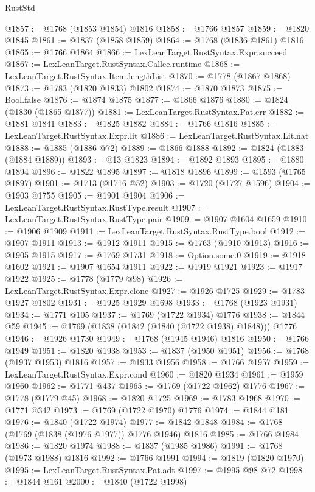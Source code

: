 \begin{lexlean}{RustStd}
\begin{coremodule}
@1857 := @1768 (@1853 @1854) @1816
@1858 := @1766 @1857
@1859 := @1820 @1845
@1861 := @1837 (@1858 @1859)
@1864 := @1768 (@1836 @1861) @1816
@1865 := @1766 @1864
@1866 := LexLeanTarget.RustSyntax.Expr.succeed
@1867 := LexLeanTarget.RustSyntax.Callee.runtime
@1868 := LexLeanTarget.RustSyntax.Item.lengthList
@1870 := @1778 (@1867 @1868)
@1873 := @1783 (@1820 @1833) @1802
@1874 := @1870 @1873
@1875 := Bool.false
@1876 := @1874 @1875
@1877 := @1866 @1876
@1880 := @1824 (@1830 (@1865 @1877))
@1881 := LexLeanTarget.RustSyntax.Pat.err
@1882 := @1881 @1841
@1883 := @1825 @1882
@1884 := @1766 @1816
@1885 := LexLeanTarget.RustSyntax.Expr.lit
@1886 := LexLeanTarget.RustSyntax.Lit.nat
@1888 := @1885 (@1886 @72)
@1889 := @1866 @1888
@1892 := @1824 (@1883 (@1884 @1889))
@1893 := @13 @1823
@1894 := @1892 @1893
@1895 := @1880 @1894
@1896 := @1822 @1895
@1897 := @1818 @1896
@1899 := @1593 (@1765 @1897)
@1901 := @1713 (@1716 @52)
@1903 := @1720 (@1727 @1596)
@1904 := @1903 @1755
@1905 := @1901 @1904
@1906 := LexLeanTarget.RustSyntax.RustType.result
@1907 := LexLeanTarget.RustSyntax.RustType.pair
@1909 := @1907 @1604 @1659
@1910 := @1906 @1909
@1911 := LexLeanTarget.RustSyntax.RustType.bool
@1912 := @1907 @1911
@1913 := @1912 @1911
@1915 := @1763 (@1910 @1913)
@1916 := @1905 @1915
@1917 := @1769 @1731
@1918 := Option.some.{0}
@1919 := @1918 @1602
@1921 := @1907 @1654 @1911
@1922 := @1919 @1921
@1923 := @1917 @1922
@1925 := @1778 (@1779 @98)
@1926 := LexLeanTarget.RustSyntax.Expr.clone
@1927 := @1926 @1725
@1929 := @1783 @1927 @1802
@1931 := @1925 @1929 @1698
@1933 := @1768 (@1923 @1931)
@1934 := @1771 @105
@1937 := @1769 (@1722 @1934) @1776
@1938 := @1844 @59
@1945 := @1769 (@1838 (@1842 (@1840 (@1722 @1938) @1848))) @1776
@1946 := @1926 @1730
@1949 := @1768 (@1945 @1946) @1816
@1950 := @1766 @1949
@1951 := @1820 @1938
@1953 := @1837 (@1950 @1951)
@1956 := @1768 (@1937 @1953) @1816
@1957 := @1933 @1956
@1958 := @1766 @1957
@1959 := LexLeanTarget.RustSyntax.Expr.cond
@1960 := @1820 @1934
@1961 := @1959 @1960
@1962 := @1771 @437
@1965 := @1769 (@1722 @1962) @1776
@1967 := @1778 (@1779 @45)
@1968 := @1820 @1725
@1969 := @1783 @1968
@1970 := @1771 @342
@1973 := @1769 (@1722 @1970) @1776
@1974 := @1844 @181
@1976 := @1840 (@1722 @1974)
@1977 := @1842 @1848
@1984 := @1768 (@1769 (@1838 (@1976 @1977)) @1776 @1946) @1816
@1985 := @1766 @1984
@1986 := @1820 @1974
@1988 := @1837 (@1985 @1986)
@1991 := @1768 (@1973 @1988) @1816
@1992 := @1766 @1991
@1994 := @1819 (@1820 @1970)
@1995 := LexLeanTarget.RustSyntax.Pat.adt
@1997 := @1995 @98 @72
@1998 := @1844 @161
@2000 := @1840 (@1722 @1998)

\end{coremodule}
\end{lexlean}
